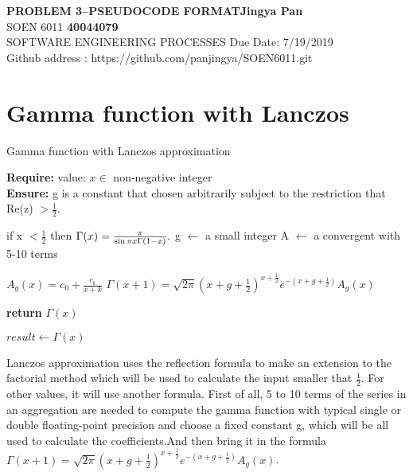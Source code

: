 \documentclass[a4paper, 11pt]{article}
\begin{document}
\noindent
\large\textbf{PROBLEM 3--PSEUDOCODE FORMAT}\hfill \textbf{Jingya Pan} \\
\normalsize SOEN 6011 \hfill \textbf{40044079} \\
 SOFTWARE ENGINEERING PROCESSES \hfill Due Date: 7/19/2019 \\
\hfill Github address : https://github.com/panjingya/SOEN6011.git

\section{Gamma function with Lanczos}
\begin{algorithm}

\caption{Gamma function with Lanczos approximation}

\textbf{Require:}  value: $x \in $ non-negative integer \\
\textbf{Ensure:} g is a constant that chosen arbitrarily subject to the restriction that Re(z) $>\frac{1}{2}$.
\begin{algorithmic}[1]

    \State if x $< \frac{1}{2}$ then
    \State \indent $\Gamma (x)={\pi  \over \sin \pi x \Gamma (1-x)}.$  
    \State g $\leftarrow$  a small integer
    \State A $\leftarrow$ a convergent with 5-10 terms 
    
    
    \State $A_{g}(x)=c_{0}+{\frac  {c_{k}}{x+k}}$
    \EndFor
    \State ${\displaystyle \Gamma (x+1)={\sqrt {2\pi }}{\left(x+g+{\tfrac {1}{2}}\right)}^{x+{\frac {1}{2}}}e^{-\left(x+g+{\frac {1}{2}}\right)}A_{g}(x)}$
    
    \State \textbf{return} $\Gamma (x)$
    \EndProcedure
\Statex

\State $result \leftarrow \Gamma (x)$ 

\end{algorithmic}
\end{algorithm}

Lanczos approximation uses the  reflection formula to make an extension to the factorial method which will be used to calculate the input smaller that $\frac{1}{2}$. For other values, it will use another formula. First of all, 5 to 10 terms of the series in an aggregation are needed to compute the gamma function with typical single or double floating-point precision and choose a fixed constant g, which will be all used to calculate the coefficients.And then bring it in the formula ${\displaystyle \Gamma (x+1)={\sqrt {2\pi }}{\left(x+g+{\tfrac {1}{2}}\right)}^{x+{\frac {1}{2}}}e^{-\left(x+g+{\frac {1}{2}}\right)}A_{g}(x)}$.
\end{document}
